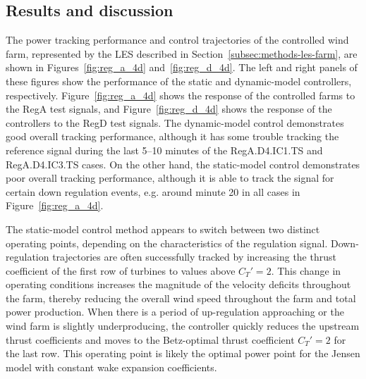 \subsection{Results and discussion}
\label{subsec:rhc-static-results}
The power tracking performance and control trajectories of the controlled wind farm, represented by the LES described in Section~\ref{subsec:methods-les-farm}, are shown in Figures~\ref{fig:reg_a_4d} and~\ref{fig:reg_d_4d}. The left and right panels of these figures show the performance of the static and dynamic-model controllers, respectively. Figure~\ref{fig:reg_a_4d} shows the response of the controlled farms to the RegA test signals, and Figure~\ref{fig:reg_d_4d} shows the response of the controllers to the RegD test signals. The dynamic-model control demonstrates good overall tracking performance, although it has some trouble tracking the reference signal during the last 5--10 minutes of the RegA.D4.IC1.TS and RegA.D4.IC3.TS cases. On the other hand, the static-model control demonstrates poor overall tracking performance, although it is able to track the signal for certain down regulation events, e.g. around minute 20 in all cases in Figure~\ref{fig:reg_a_4d}.

The static-model control method appears to switch between two distinct operating points, depending on the characteristics of the regulation signal. Down-regulation trajectories are often successfully tracked by increasing the thrust coefficient of the first row of turbines to values above \mbox{$C_T'=2$}. This change in operating conditions increases the magnitude of the velocity deficits throughout the farm, thereby reducing the overall wind speed throughout the farm and total power production. When there is a period of up-regulation approaching or the wind farm is slightly underproducing, the controller quickly reduces the upstream thrust coefficients and moves to the Betz-optimal thrust coefficient \mbox{$C_T'=2$} \cite{Goit2015a} for the last row. This operating point is likely the optimal power point for the Jensen model with constant wake expansion coefficients.

\clearpage 

